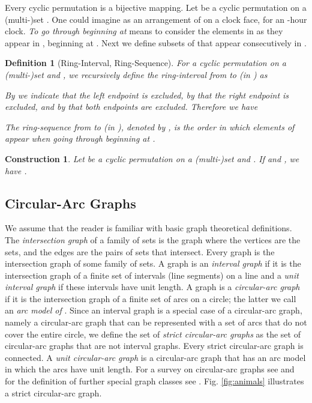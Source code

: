 \documentclass[10pt]{article}
\newtheorem{definition}[theorem]{Definition}
\newtheorem{construction}[theorem]{Construction}
\begin{document}
Every cyclic permutation is a bijective mapping.
Let  be a cyclic permutation on a (multi-)set .
One could imagine  as an arrangement of  on a clock face, for an -hour clock.
\emph{To go through  beginning at } means to consider the elements in 
 as they appear in , beginning at . Next we define subsets of  that appear 
consecutively in .


\begin{definition}[Ring-Interval, Ring-Sequence]\label{interval}
For a cyclic permutation  on a (multi-)set  and , we recursively define 
the \emph{ring-interval from  to  (in )} as

By  we indicate that the left endpoint is excluded, by   that the right endpoint is
excluded, and by  that both endpoints  are excluded.
Therefore we have 

The \emph{ring-sequence from  to  (in )}, denoted by 
, is the order in which elements of  appear when going through  beginning at .






\end{definition}



\begin{construction}\label{ringkombi}
Let  be a cyclic permutation on a (multi-)set  and .
If  and , we 
have .
\end{construction}


\subsection{Circular-Arc Graphs}\label{sub:CAG}


We assume that the reader is familiar with basic graph theoretical definitions.
The \emph{intersection graph} of a family of sets is the graph where the vertices are the sets, 
and the edges are the pairs of sets that intersect. Every graph is the intersection graph of 
some family of sets. A graph is an \emph{interval graph} if it is the intersection graph of a 
finite set of intervals (line segments) on a line and a \emph{unit interval graph} if these 
intervals have unit length.
A graph  is a \emph{circular-arc graph} if it is the intersection graph of a finite set of 
arcs on a circle; the latter we call an \emph{arc model of }.
Since an interval graph is a special case of a circular-arc graph, namely a circular-arc graph 
that can be represented with a set of arcs that do not cover the entire circle, we define the 
set of \emph{strict circular-arc graphs} as the set of circular-arc graphs that are not interval 
graphs. Every strict circular-arc graph is connected.
A \emph{unit circular-arc graph} is a circular-arc graph that has an arc model in which the 
arcs have unit length. For a survey on circular-arc graphs see \cite{Lin20095618} 
and for the definition of further special graph classes see \cite{BLS99}.
Fig. \ref{fig:animals} illustrates a strict circular-arc graph.
\end{document}
